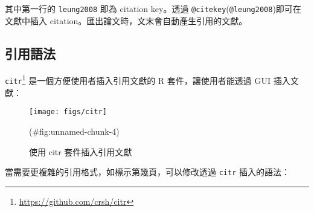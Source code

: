 \documentclass[oneside]{book}
\renewcommand{\href}[2]{#2\footnote{\url{#1}}}
\begin{document}
其中第一行的 \texttt{leung2008} 即為 citation key。透過 \texttt{@citekey}(\texttt{@leung2008})即可在文獻中插入 citation。匯出論文時，文末會自動產生引用的文獻。

\hypertarget{cite-syntax}{%
\subsection{引用語法}\label{cite-syntax}}

\href{https://github.com/crsh/citr}{\texttt{citr}} 是一個方便使用者插入引用文獻的 R 套件，讓使用者能透過 GUI 插入文獻：

\begin{figure}

{\centering \texttt{[image: figs/citr]} 

}

\caption{使用 citr 套件插入引用文獻}(\#fig:unnamed-chunk-4)
\end{figure}

當需要更複雜的引用格式，如標示第幾頁，可以修改透過 \texttt{citr} 插入的語法：
\end{document}
